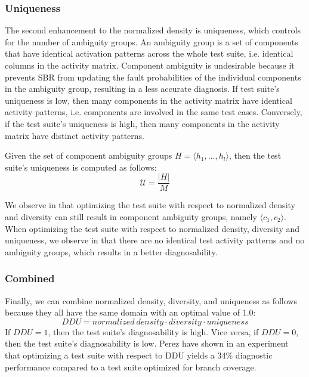\documentclass[twoside,a4paper,11pt]{memoir}
\begin{document}
\subsubsection{Uniqueness}
The second enhancement to the normalized density is uniqueness, which controls for the number of ambiguity groups.
An ambiguity group is a set of components that have identical activation patterns across the whole test suite, i.e. identical columns in the activity matrix.
Component ambiguity is undesirable because it prevents SBR from updating the fault probabilities of the individual components in the ambiguity group, resulting in a less accurate diagnosis.
If test suite's uniqueness is low, then many components in the activity matrix have identical activity patterns, i.e. components are involved in the same test cases.
Conversely, if the test suite's uniqueness is high, then many components in the activity matrix have distinct activity patterns.

Given the set of component ambiguity groups $H = \langle h_1, \dots, h_l \rangle$, then the test suite's uniqueness is computed as follows:
\begin{equation}
  \mathcal{U} = \frac{|H|}{M}
\end{equation}

We observe in  that optimizing the test suite with respect to normalized density and diversity can still result in component ambiguity groups, namely $\langle c_1, c_2 \rangle$.
When optimizing the test suite with respect to normalized density, diversity and uniqueness, we observe in  that there are no identical test activity patterns and no ambiguity groups, which results in a better diagnosability.

\subsubsection{Combined}
Finally, we can combine normalized density, diversity, and uniqueness as follows because they all have the same domain with an optimal value of 1.0:
\begin{equation}
 DDU = normalized\ density \cdot diversity \cdot uniqueness
\end{equation}
If $DDU = 1$, then the test suite's diagnosability is high.
Vice versa, if $DDU = 0$, then the test suite's diagnosability is low.
Perez \etal \cite{DBLP:conf/icse/PerezAD17} have shown in an experiment that optimizing a test suite with respect to DDU yields a 34\% diagnostic performance compared to a test suite optimized for branch coverage.
\end{document}
